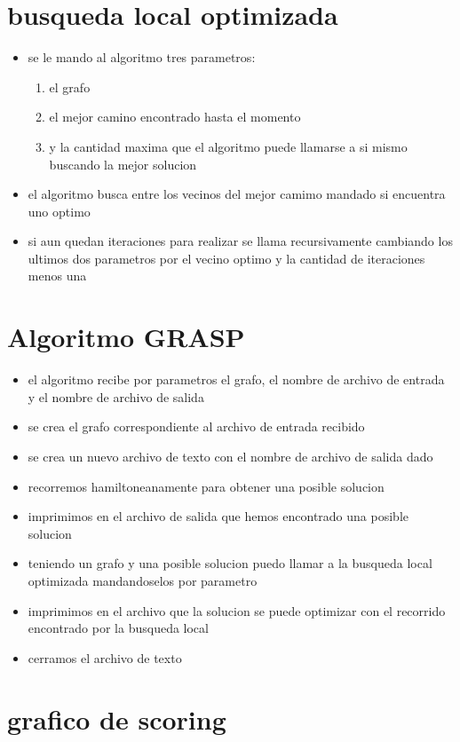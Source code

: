 \documentclass[a4paper,11pt]{article}
\begin{document}
\section{busqueda local optimizada}
\begin{itemize}
	\item se le mando al algoritmo tres parametros:
	\begin{enumerate}
		\item el grafo
		\item el mejor camino encontrado hasta el momento
		\item y la cantidad maxima que el algoritmo puede llamarse a si mismo buscando la mejor solucion
	\end{enumerate}
	\item el algoritmo busca entre los vecinos del mejor camimo mandado si encuentra uno optimo
	\item si aun quedan iteraciones para realizar se llama recursivamente cambiando los ultimos dos parametros por el vecino optimo y la cantidad de iteraciones menos una		
\end{itemize}

\section{Algoritmo GRASP}
\begin{itemize}
	\item el algoritmo recibe por parametros el grafo, el nombre de archivo de entrada y el nombre de archivo de salida
	\item se crea el grafo correspondiente al archivo de entrada recibido
	\item se crea un nuevo archivo de texto con el nombre de archivo de salida dado
	\item recorremos hamiltoneanamente para obtener una posible solucion
	\item imprimimos en el archivo de salida que hemos encontrado una posible solucion
	\item teniendo un grafo y una posible solucion puedo llamar a la busqueda local optimizada mandandoselos por parametro
	\item imprimimos en el archivo que la solucion se puede optimizar con el recorrido encontrado por la busqueda local 
	\item cerramos el archivo de texto
\end{itemize}

\section{grafico de scoring}
\end{document}
